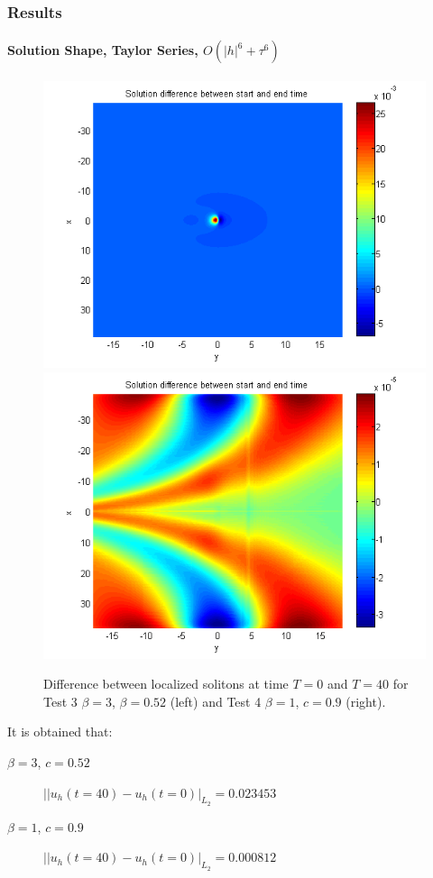 \documentclass{beamer}
\begin{document}

\begin{frame}
\frametitle{Results}
\framesubtitle{Solution Shape, Taylor Series, $O(|h|^6+\tau^6)$}
\begin{figure}[ht]
	\centering
	\begin{minipage}[b]{0.49\linewidth}
		\includegraphics[width=\linewidth]{figures/compare_start_end_bt3_c052.png}
	\end{minipage}	
	\begin{minipage}[b]{0.49\linewidth}
		 \includegraphics[width=\linewidth]{figures/compare_start_end_bt1_c09.png}
	\end{minipage}

Difference between localized solitons at time $T=0$ and $T=40$ for Test 3 $\beta = 3$, $\beta = 0.52$  (left) and Test 4 $\beta=1$, $c=0.9$ (right). 
\end{figure}

It is obtained that:
\begin{description}
 \item[$\beta = 3$, $c = 0.52$] $||u_h(t=40)-u_h(t=0)|_{L_2} = 0.023453$
 \item[$\beta = 1$, $c = 0.9$] $||u_h(t=40)-u_h(t=0)|_{L_2} = 0.000812$
\end{description}
\end{frame}
\end{document}
